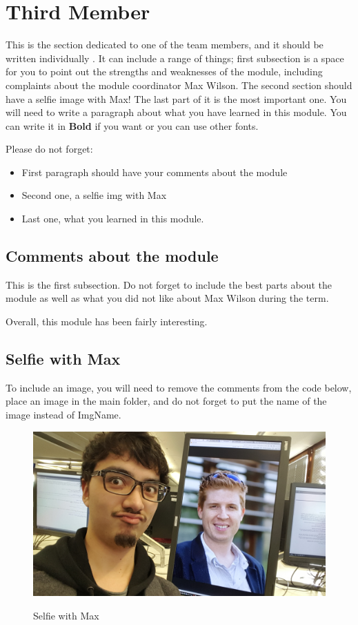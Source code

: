 \section{Third Member}
This is the section dedicated to one of the team members, and it should be written individually . It can include a range of things; first subsection is a space for you to point out the strengths and weaknesses of the module, including complaints about the module coordinator Max Wilson. The second section should have a selfie image with Max! The last part of it is the most important one. You will need to write a paragraph about what you have learned in this module. You can write it in \textbf{Bold} if you want or you can use other fonts. 

Please do not forget:
\begin{itemize}
	\item First paragraph should have your comments about the module
	\item Second one, a selfie img with Max
	\item Last one, what you learned in this module.
\end{itemize}

\subsection{Comments about the module}
This is the first subsection. Do not forget to include the best parts about the module as well as what you did not like about Max Wilson during the term.

Overall, this module has been fairly interesting. 

\subsection{Selfie with Max}

To include an image, you will need to remove the comments from the code below, place an image in the main folder, and do not forget to put the name of the image instead of ImgName. 

\begin{figure}[h]
\caption{Selfie with Max}
\centering
\includegraphics{psyjk4selfie}
\label{fig:selfie}
\end{figure}

